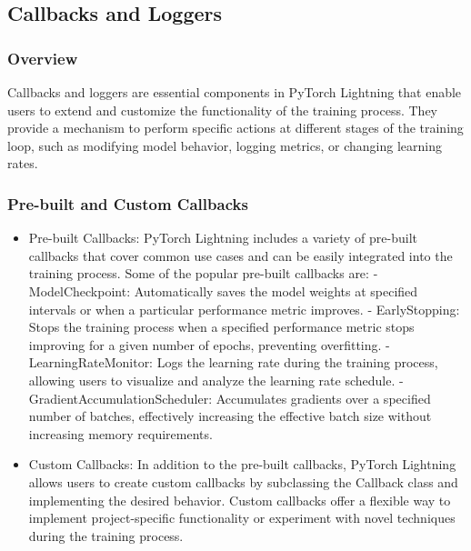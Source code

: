 \documentclass[12pt]{article}
\begin{document}
\subsection{Callbacks and Loggers}

\subsubsection{Overview}

Callbacks and loggers are essential components in PyTorch Lightning that enable users to extend and customize the functionality of the training process.
They provide a mechanism to perform specific actions at different stages of the training loop, such as modifying model behavior, logging metrics, or changing learning rates.

\subsubsection{Pre-built and Custom Callbacks}

\begin{itemize}
    \item Pre-built Callbacks: PyTorch Lightning includes a variety of pre-built callbacks that cover common use cases and can be easily integrated into the training process. Some of the popular pre-built callbacks are:
    - ModelCheckpoint: Automatically saves the model weights at specified intervals or when a particular performance metric improves. \newline
    - EarlyStopping: Stops the training process when a specified performance metric stops improving for a given number of epochs, preventing overfitting. \newline
    - LearningRateMonitor: Logs the learning rate during the training process, allowing users to visualize and analyze the learning rate schedule. \newline
    - GradientAccumulationScheduler: Accumulates gradients over a specified number of batches, effectively increasing the effective batch size without increasing memory requirements.
    \item Custom Callbacks: In addition to the pre-built callbacks, PyTorch Lightning allows users to create custom callbacks by subclassing the Callback class and implementing the desired behavior.
    Custom callbacks offer a flexible way to implement project-specific functionality or experiment with novel techniques during the training process.
\end{itemize}
\end{document}
